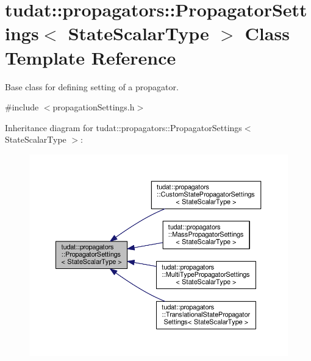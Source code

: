 \hypertarget{classtudat_1_1propagators_1_1PropagatorSettings}{}\section{tudat\+:\+:propagators\+:\+:Propagator\+Settings$<$ State\+Scalar\+Type $>$ Class Template Reference}
\label{classtudat_1_1propagators_1_1PropagatorSettings}


Base class for defining setting of a propagator.  




{\ttfamily \#include $<$propagation\+Settings.\+h$>$}



Inheritance diagram for tudat\+:\+:propagators\+:\+:Propagator\+Settings$<$ State\+Scalar\+Type $>$\+:
\nopagebreak
\begin{figure}[H]
\begin{center}
\leavevmode
\includegraphics[width=350pt]{classtudat_1_1propagators_1_1PropagatorSettings__inherit__graph}
\end{center}
\end{figure}
